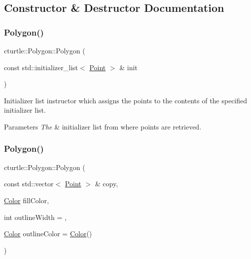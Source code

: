 \subsection{Constructor \& Destructor Documentation}
\mbox{\label{classcturtle_1_1Polygon_a035f78fca7139d12bc9626105bc326e3}} 
\subsubsection{\texorpdfstring{Polygon()}{Polygon()}\hspace{0.1cm}{\footnotesize\ttfamily [1/3]}}
{\footnotesize\ttfamily cturtle\+::\+Polygon\+::\+Polygon (\begin{DoxyParamCaption}\item[{const std\+::initializer\+\_\+list$<$ \hyperlink{structcturtle_1_1ivec2}{Point} $>$ \&}]{init }\end{DoxyParamCaption})\hspace{0.3cm}{\ttfamily [inline]}}



Initializer list instructor which assigns the points to the contents of the specified initializer list. 


\begin{DoxyParams}{Parameters}
{\em The} & initializer list from where points are retrieved. \\
\hline
\end{DoxyParams}
\mbox{\label{classcturtle_1_1Polygon_ab0832036c581dcf59a156527187eb033}} 
\subsubsection{\texorpdfstring{Polygon()}{Polygon()}\hspace{0.1cm}{\footnotesize\ttfamily [2/3]}}
{\footnotesize\ttfamily cturtle\+::\+Polygon\+::\+Polygon (\begin{DoxyParamCaption}\item[{const std\+::vector$<$ \hyperlink{structcturtle_1_1ivec2}{Point} $>$ \&}]{copy,  }\item[{\hyperlink{classcturtle_1_1Color}{Color}}]{fill\+Color,  }\item[{int}]{outline\+Width = {},  }\item[{\hyperlink{classcturtle_1_1Color}{Color}}]{outline\+Color = {\ttfamily \hyperlink{classcturtle_1_1Color}{Color}()} }\end{DoxyParamCaption})\hspace{0.3cm}{\ttfamily [inline]}}



